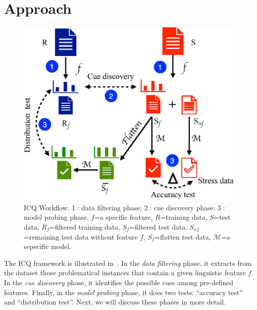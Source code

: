 \section{Approach}
\label{sec:approach}

\begin{figure}[th]
\centering
\includegraphics[width=0.6\columnwidth]{picture/framework.eps}
\caption{ICQ Workflow. \textcircled{1}: data filtering phase; \textcircled{2}: cue discovery phase; 
\textcircled{3}: model probing phase. $f$=a specific feature, $R$=training data, $S$=test data, $R_f$=filtered training data, 
$S_f$=filtered test data, $S_{nf}$=remaining test data without feature $f$, $\overline{S_f}$=flatten test data, $\mathcal{M}$=a sepecific model.}
\label{fig:framework}
\end{figure}

The ICQ framework is illustrated in~.
In the \textit{data filtering} phase, it extracts from the dataset
those problematical instances that contain a given linguistic feature $f$. 
In the \textit{cue discovery} phase, it identifies the possible cues among pre-defined features. 
Finally, in the \textit{model probing} phase,
it does two tests: ``accuracy test'' and ``distribution test''.
Next, we will discuss these phases in more detail.


